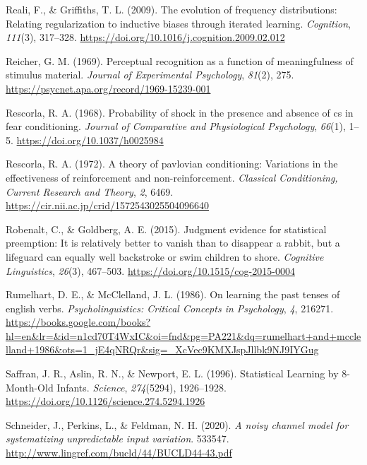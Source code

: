 \documentclass[
  12pt,
  letterpaper,
]{scrreport}
\newlength{\cslhangindent}
\newenvironment{CSLReferences}[2] %
 {\begin{list}{}{%
  \setlength{\itemindent}{0pt}
  \setlength{\leftmargin}{0pt}
  \setlength{\parsep}{0pt}
  \ifodd #1
   \setlength{\leftmargin}{\cslhangindent}
   \setlength{\itemindent}{-1\cslhangindent}
  \fi
  \setlength{\itemsep}{#2\baselineskip}}}
 {\end{list}}
\begin{document}
\begin{CSLReferences}{1}{0}
Reali, F., \& Griffiths, T. L. (2009). The evolution of frequency
distributions: Relating regularization to inductive biases through
iterated learning. \emph{Cognition}, \emph{111}(3), 317--328.
\url{https://doi.org/10.1016/j.cognition.2009.02.012}

Reicher, G. M. (1969). Perceptual recognition as a function of
meaningfulness of stimulus material. \emph{Journal of Experimental
Psychology}, \emph{81}(2), 275.
\url{https://psycnet.apa.org/record/1969-15239-001}

Rescorla, R. A. (1968). Probability of shock in the presence and absence
of cs in fear conditioning. \emph{Journal of Comparative and
Physiological Psychology}, \emph{66}(1), 1--5.
\url{https://doi.org/10.1037/h0025984}

Rescorla, R. A. (1972). A theory of pavlovian conditioning: Variations
in the effectiveness of reinforcement and non-reinforcement.
\emph{Classical Conditioning, Current Research and Theory}, \emph{2},
6469. \url{https://cir.nii.ac.jp/crid/1572543025504096640}

Robenalt, C., \& Goldberg, A. E. (2015). Judgment evidence for
statistical preemption: It is relatively better to vanish than to
disappear a rabbit, but a lifeguard can equally well backstroke or swim
children to shore. \emph{Cognitive Linguistics}, \emph{26}(3), 467--503.
\url{https://doi.org/10.1515/cog-2015-0004}

Rumelhart, D. E., \& McClelland, J. L. (1986). On learning the past
tenses of english verbs. \emph{Psycholinguistics: Critical Concepts in
Psychology}, \emph{4}, 216271.
\url{https://books.google.com/books?hl=en&lr=&id=n1cd70T4WxIC&oi=fnd&pg=PA221&dq=rumelhart+and+mcclelland+1986&ots=1_jE4qNRQr&sig=_XcVec9KMXJspJllbk9NJ9IYGug}

Saffran, J. R., Aslin, R. N., \& Newport, E. L. (1996). Statistical
Learning by 8-Month-Old Infants. \emph{Science}, \emph{274}(5294),
1926--1928. \url{https://doi.org/10.1126/science.274.5294.1926}

Schneider, J., Perkins, L., \& Feldman, N. H. (2020). \emph{A noisy
channel model for systematizing unpredictable input variation}. 533547.
\url{http://www.lingref.com/bucld/44/BUCLD44-43.pdf}


\end{CSLReferences}
\end{document}
